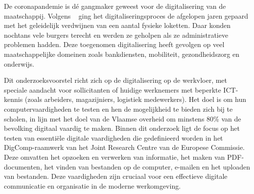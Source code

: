 De coronapandemie is dé gangmaker geweest voor de digitalisering van de maatschappij. Volgens ~\textcite{Unia} ging het digitaliseringsproces de afgelopen jaren gepaard met het geleidelijk verdwijnen van een aantal fysieke loketten. Daar konden nochtans vele burgers terecht en werden ze geholpen als ze administratieve problemen hadden. Deze toegenomen digitalisering heeft gevolgen op veel maatschappelijke domeinen zoals bankdiensten, mobiliteit, gezondheidszorg en onderwijs.

Dit onderzoeksvoorstel richt zich op de digitalisering op de werkvloer, met speciale aandacht voor sollicitanten of huidige werknemers met beperkte ICT-kennis (zoals arbeiders, magazijniers, logistiek medewerkers). Het doel is om hun computervaardigheden te testen en hen de mogelijkheid te bieden zich bij te scholen, in lijn met het doel van de Vlaamse overheid om minstens 80\% van de bevolking digitaal vaardig te maken.
Binnen dit onderzoek ligt de focus op het testen van essentiële digitale vaardigheden die gedefinieerd worden in het DigComp-raamwerk van het Joint Research Centre van de Europese Commissie. Deze omvatten het opzoeken en verwerken van informatie, het maken van PDF-documenten, het vinden van bestanden op de computer, e-mailen en het uploaden van bestanden. Deze vaardigheden zijn cruciaal voor een effectieve digitale communicatie en organisatie in de moderne werkomgeving. ~\textcite{DigCompFramework}

